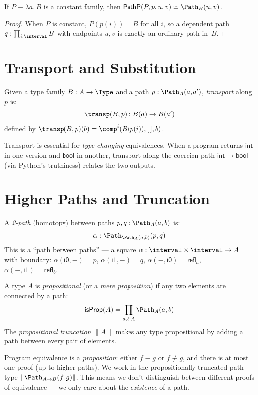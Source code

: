 \begin{proposition}
If $P \equiv \lambda a.\, B$ is a constant family, then
$\mathsf{PathP}(P, p, u, v) \simeq \Path_B(u, v)$.
\end{proposition}

\begin{proof}
When $P$ is constant, $P(p(i)) = B$ for all $i$, so a dependent path
$q : \prod_{i : \interval} B$ with endpoints $u, v$ is exactly an
ordinary path in~$B$.
\end{proof}

\section{Transport and Substitution}

\begin{definition}[Transport]
Given a type family $B : A \to \Type$ and a path $p : \Path_A(a, a')$,
\emph{transport} along $p$ is:
\[
  \transp(B, p) : B(a) \to B(a')
\]
defined by $\transp(B, p)(b) = \comp^i(B(p(i)), [\,], b)$.
\end{definition}

Transport is essential for \emph{type-changing} equivalences.  When
a program returns $\mathsf{int}$ in one version and $\mathsf{bool}$
in another, transport along the coercion path $\mathsf{int} \to
\mathsf{bool}$ (via Python's truthiness) relates the two outputs.

\section{Higher Paths and Truncation}

\begin{definition}
A \emph{2-path} (homotopy) between paths $p, q : \Path_A(a, b)$ is:
\[
  \alpha : \Path_{\Path_A(a,b)}(p, q)
\]
This is a ``path between paths'' --- a square
$\alpha : \interval \times \interval \to A$ with boundary:
$\alpha(\mathsf{i0}, -) = p$, $\alpha(\mathsf{i1}, -) = q$,
$\alpha(-, \mathsf{i0}) = \mathsf{refl}_a$,
$\alpha(-, \mathsf{i1}) = \mathsf{refl}_b$.
\end{definition}

\begin{definition}
A type $A$ is \emph{propositional} (or a \emph{mere proposition}) if
any two elements are connected by a path:
\[
  \mathsf{isProp}(A) = \prod_{a, b : A} \Path_A(a, b)
\]
The \emph{propositional truncation} $\|A\|$ makes any type
propositional by adding a path between every pair of elements.
\end{definition}

\begin{remark}
Program equivalence is a \emph{proposition}: either $f \equiv g$ or
$f \not\equiv g$, and there is at most one proof (up to higher paths).
We work in the propositionally truncated path type
$\|\Path_{A \to B}(f, g)\|$.  This means we don't distinguish between
different proofs of equivalence --- we only care about the
\emph{existence} of a path.
\end{remark}


